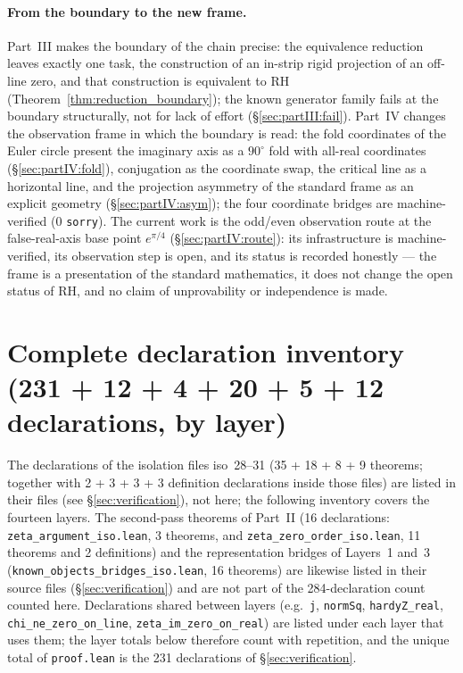 \documentclass{article}
\begin{document}
\paragraph{From the boundary to the new frame.}
Part~III makes the boundary of the chain precise: the equivalence
reduction leaves exactly one task, the construction of an in-strip rigid
projection of an off-line zero, and that construction is equivalent to
RH (Theorem~\ref{thm:reduction_boundary}); the known generator family
fails at the boundary structurally, not for lack of effort
(\S\ref{sec:partIII:fail}). Part~IV changes the observation frame in
which the boundary is read: the fold coordinates of the Euler circle
present the imaginary axis as a $90^\circ$ fold with all-real
coordinates (\S\ref{sec:partIV:fold}), conjugation as the coordinate
swap, the critical line as a horizontal line, and the projection
asymmetry of the standard frame as an explicit geometry
(\S\ref{sec:partIV:asym}); the four coordinate bridges are
machine-verified (0 \texttt{sorry}). The current work is the
odd/even observation route at the false-real-axis base point
$e^{\pi/4}$ (\S\ref{sec:partIV:route}): its infrastructure is
machine-verified, its observation step is open, and its status is
recorded honestly --- the frame is a presentation of the standard
mathematics, it does not change the open status of RH, and no claim of
unprovability or independence is made.

\appendix
\section{Complete declaration inventory (231 + 12 + 4 + 20 + 5 + 12 declarations, by layer)}
\label{app:inventory}

The declarations of the isolation files iso~28--31 (35 + 18 + 8 + 9
theorems; together with 2 + 3 + 3 + 3 definition declarations inside
those files) are
listed in their files (see \S\ref{sec:verification}), not here; the
following inventory covers the fourteen layers. The second-pass theorems
of Part~II (16 declarations: \texttt{zeta\_argument\_iso.lean}, 3 theorems, and \texttt{zeta\_zero\_order\_iso.lean}, 11 theorems and 2 definitions)
and the representation bridges of Layers~1 and~3
(\texttt{known\_objects\_bridges\_iso.lean}, 16 theorems) are likewise
listed in their source files (\S\ref{sec:verification}) and are not part
of the 284-declaration count counted here. Declarations shared
between layers (e.g.\ \texttt{j}, \texttt{normSq}, \texttt{hardyZ\_real},
\texttt{chi\_ne\_zero\_on\_line}, \texttt{zeta\_im\_zero\_on\_real}) are
listed under each layer that uses them; the layer totals below therefore
count with repetition, and the unique total of \texttt{proof.lean} is the
231 declarations of \S\ref{sec:verification}.
\end{document}
